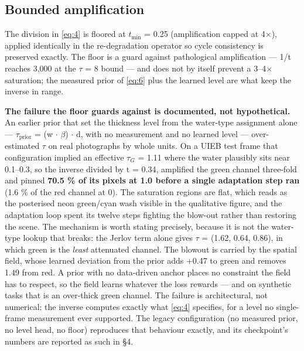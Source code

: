 \documentclass[journal]{IEEEtran}
\begin{document}
\subsection{Bounded amplification}
The division in \eqref{eq:4} is floored at $t_{\min}$ = 0.25 (amplification capped at 4$\times$), applied identically in the re-degradation operator so cycle consistency is preserved exactly. The floor is a guard against pathological amplification --- 1/t reaches 3,000 at the $\tau$ = 8 bound --- and does not by itself prevent a 3--4$\times$ saturation; the measured prior of \eqref{eq:6} plus the learned level are what keep the inverse in range.

\textbf{The failure the floor guards against is documented, not hypothetical.} An earlier prior that set the thickness level from the water-type assignment alone --- $\tau_{\mathrm{prior}}$ = (w $\cdot$ $\beta$) $\cdot$ d, with no measurement and no learned level --- over-estimated $\tau$ on real photographs by whole units. On a UIEB test frame that configuration implied an effective $\tau_G$ = 1.11 where the water plausibly sits near 0.1--0.3, so the inverse divided by t = 0.34, amplified the green channel three-fold and pinned \textbf{70.5 \% of its pixels at 1.0 before a single adaptation step ran} (1.6 \% of the red channel at 0). The saturation regions are flat, which reads as the posterised neon green/cyan wash visible in the qualitative figure, and the adaptation loop spent its twelve steps fighting the blow-out rather than restoring the scene. The mechanism is worth stating precisely, because it is not the water-type lookup that breaks: the Jerlov term alone gives $\tau$ = (1.62, 0.64, 0.86), in which green is the \emph{least} attenuated channel. The blowout is carried by the spatial field, whose learned deviation from the prior adds +0.47 to green and removes 1.49 from red. A prior with no data-driven anchor places no constraint the field has to respect, so the field learns whatever the loss rewards --- and on synthetic tasks that is an over-thick green channel. The failure is architectural, not numerical: the inverse computes exactly what \eqref{eq:4} specifies, for a level no single-frame measurement ever supported. The legacy configuration (no measured prior, no level head, no floor) reproduces that behaviour exactly, and its checkpoint's numbers are reported as such in \S{}4.
\end{document}
